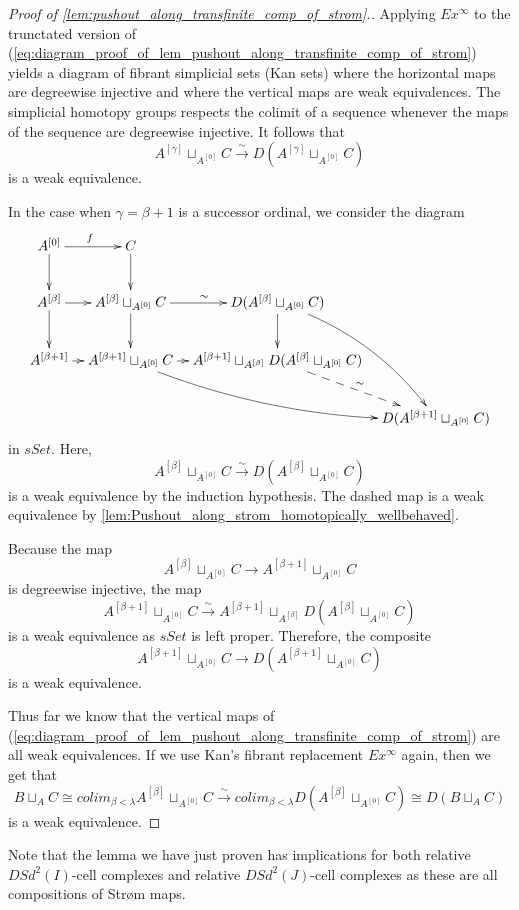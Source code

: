 \begin{proof}[Proof of \cref{lem:pushout_along_transfinite_comp_of_strom}.]
Applying $Ex^\infty$ to the trunctated version of (\ref{eq:diagram_proof_of_lem_pushout_along_transfinite_comp_of_strom}) yields a diagram of fibrant simplicial sets (Kan sets) where the horizontal maps are degreewise injective and where the vertical maps are weak equivalences. The simplicial homotopy groups respects the colimit of a sequence whenever the maps of the sequence are degreewise injective. It follows that
\[A^{[\gamma ]}\sqcup _{A^{[0]}}C\xrightarrow{\sim } D(A^{[\gamma ]}\sqcup _{A^{[0]}}C)\]
is a weak equivalence.

In the case when $\gamma =\beta +1$ is a successor ordinal, we consider the diagram
\begin{displaymath}
\xymatrix@C=0.8em{
A^{[0]} \ar[d] \ar[r]^{f} & C \ar[d] \\
A^{[\beta ]}\ar[d] \ar[r] & A^{[\beta ]}\sqcup _{A^{[0]}}C \ar[d] \ar[r]^\sim & D(A^{[\beta ]}\sqcup _{A^{[0]}}C) \ar[d] \ar@/^1pc/[ddr] \\
A^{[\beta +1]} \ar[r] & A^{[\beta +1]}\sqcup _{A^{[0]}}C \ar@/_1pc/[drr] \ar[r] & A^{[\beta +1]}\sqcup _{A^{[\beta ]}}D(A^{[\beta ]}\sqcup _{A^{[0]}}C) \ar@{-->}[dr]^\sim \\
&&& D(A^{[\beta +1]}\sqcup _{A^{[0]}}C)
}
\end{displaymath}
in $sSet$. Here, 
\[A^{[\beta ]}\sqcup _{A^{[0]}}C\xrightarrow{\sim } D(A^{[\beta ]}\sqcup _{A^{[0]}}C)\]
is a weak equivalence by the induction hypothesis. The dashed map is a weak equivalence by \cref{lem:Pushout_along_strom_homotopically_wellbehaved}.

Because the map
\[A^{[\beta ]}\sqcup _{A^{[0]}}C\to A^{[\beta +1]}\sqcup _{A^{[0]}}C\]
is degreewise injective, the map
\[A^{[\beta +1]}\sqcup _{A^{[0]}}C\xrightarrow{\sim } A^{[\beta +1]}\sqcup _{A^{[\beta ]}}D(A^{[\beta ]}\sqcup _{A^{[0]}}C)\]
is a weak equivalence as $sSet$ is left proper. Therefore, the composite
\[A^{[\beta +1]}\sqcup _{A^{[0]}}C\to D(A^{[\beta +1]}\sqcup _{A^{[0]}}C)\]
is a weak equivalence.

Thus far we know that the vertical maps of (\ref{eq:diagram_proof_of_lem_pushout_along_transfinite_comp_of_strom}) are all weak equivalences. If we use Kan's fibrant replacement $Ex^\infty$ again, then we get that
\[B\sqcup _AC\cong colim_{\beta <\lambda }A^{[\beta ]}\sqcup _{A^{[0]}}C\xrightarrow{\sim } colim_{\beta <\lambda }D(A^{[\beta ]}\sqcup _{A^{[0]}}C)\cong D(B\sqcup _AC)\]
is a weak equivalence.
\end{proof}
\noindent Note that the lemma we have just proven has implications for both relative $DSd^2(I)$-cell complexes and relative $DSd^2(J)$-cell complexes as these are all compositions of Str\o m maps.

